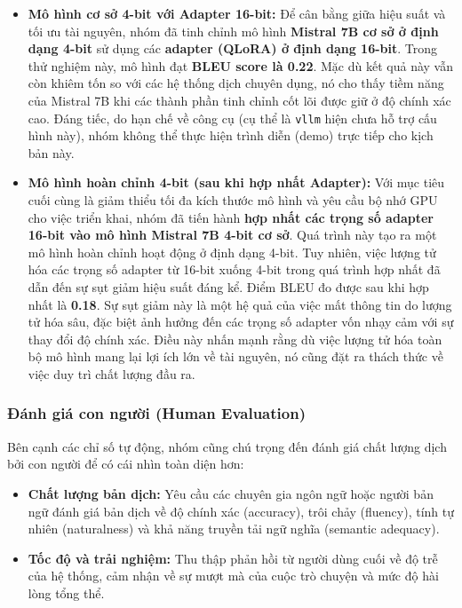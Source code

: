 \begin{itemize}
    \item \textbf{Mô hình cơ sở 4-bit với Adapter 16-bit:}
    Để cân bằng giữa hiệu suất và tối ưu tài nguyên, nhóm đã tinh chỉnh mô hình \textbf{Mistral 7B cơ sở ở định dạng 4-bit} sử dụng các \textbf{adapter (QLoRA) ở định dạng 16-bit}. Trong thử nghiệm này, mô hình đạt \textbf{BLEU score là 0.22}. Mặc dù kết quả này vẫn còn khiêm tốn so với các hệ thống dịch chuyên dụng, nó cho thấy tiềm năng của Mistral 7B khi các thành phần tinh chỉnh cốt lõi được giữ ở độ chính xác cao. Đáng tiếc, do hạn chế về công cụ (cụ thể là \texttt{vllm} hiện chưa hỗ trợ cấu hình này), nhóm không thể thực hiện trình diễn (demo) trực tiếp cho kịch bản này.

    \item \textbf{Mô hình hoàn chỉnh 4-bit (sau khi hợp nhất Adapter):}
    Với mục tiêu cuối cùng là giảm thiểu tối đa kích thước mô hình và yêu cầu bộ nhớ GPU cho việc triển khai, nhóm đã tiến hành \textbf{hợp nhất các trọng số adapter 16-bit vào mô hình Mistral 7B 4-bit cơ sở}. Quá trình này tạo ra một mô hình hoàn chỉnh hoạt động ở định dạng 4-bit. Tuy nhiên, việc lượng tử hóa các trọng số adapter từ 16-bit xuống 4-bit trong quá trình hợp nhất đã dẫn đến sự sụt giảm hiệu suất đáng kể. Điểm BLEU đo được sau khi hợp nhất là \textbf{0.18}. Sự sụt giảm này là một hệ quả của việc mất thông tin do lượng tử hóa sâu, đặc biệt ảnh hưởng đến các trọng số adapter vốn nhạy cảm với sự thay đổi độ chính xác. Điều này nhấn mạnh rằng dù việc lượng tử hóa toàn bộ mô hình mang lại lợi ích lớn về tài nguyên, nó cũng đặt ra thách thức về việc duy trì chất lượng đầu ra.
\end{itemize}


\subsubsection{Đánh giá con người (Human Evaluation)}
Bên cạnh các chỉ số tự động, nhóm cũng chú trọng đến đánh giá chất lượng dịch bởi con người để có cái nhìn toàn diện hơn:
\begin{itemize}
    \item \textbf{Chất lượng bản dịch:} Yêu cầu các chuyên gia ngôn ngữ hoặc người bản ngữ đánh giá bản dịch về độ chính xác (accuracy), trôi chảy (fluency), tính tự nhiên (naturalness) và khả năng truyền tải ngữ nghĩa (semantic adequacy).
    \item \textbf{Tốc độ và trải nghiệm:} Thu thập phản hồi từ người dùng cuối về độ trễ của hệ thống, cảm nhận về sự mượt mà của cuộc trò chuyện và mức độ hài lòng tổng thể.
\end{itemize}


